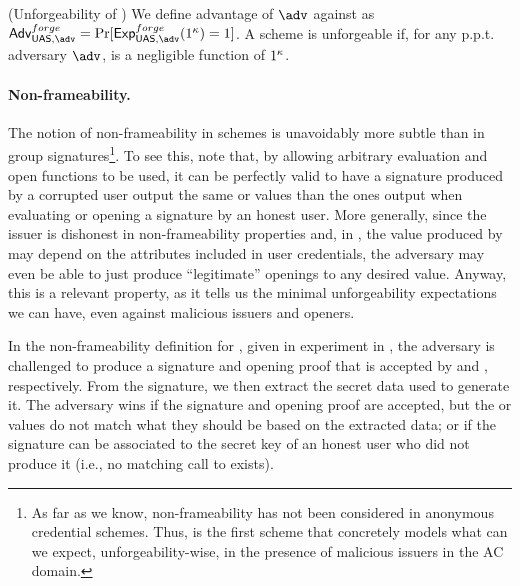 

\begin{definition}{(Unforgeability of \UAS)}
  \label{def:forge-uas}  
  We define advantage \AdvForge of $\adv$ against \ExpForge as $\AdvForge=
  \Pr\lbrack\ExpForge(1^\secpar)=1\rbrack$.
  A \UAS scheme is unforgeable if, for any p.p.t. adversary $\adv$, \AdvForge is
  a negligible function of $1^\kappa$.
\end{definition}

\paragraph{Non-frameability.} %
The notion of non-frameability in \UAS schemes is unavoidably more subtle than
in group signatures\footnote{As far as we know, non-frameability has not been
  considered in anonymous credential schemes. Thus, \UAS is the first scheme
  that concretely models what can we expect, unforgeability-wise, in the
  presence of malicious issuers in the AC domain.}. To see
this, note that, by allowing arbitrary evaluation and open functions to be used,
it can be perfectly valid to have a signature produced by a corrupted user
output the same \Yeval or \yinsp values than the ones output when evaluating or
opening a signature by an honest user.
%
More generally, since the issuer is dishonest in non-frameability properties
and, in \UAS, the value produced by \Open may depend on the attributes
included in user credentials, the adversary may even be able to just produce
``legitimate'' openings to any desired value. Anyway, this is
a relevant property, as it tells us the minimal unforgeability expectations we
can have, even against malicious issuers and openers.

In the non-frameability definition for \UAS, given in experiment \ExpNonframe in
, the adversary is challenged to produce a signature
and opening proof that is accepted by \Verify and \Judge, respectively. From
the signature, we then extract the secret data used to generate it. The
adversary wins if the signature and opening proof are accepted, but the \yeval
or \yinsp values do not match what they should be based on the extracted data;
or if the signature can be associated to the secret key of an honest user who
did not produce it (i.e., no matching call to \SIGN exists).

